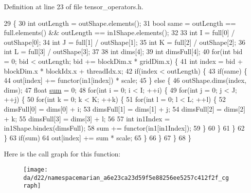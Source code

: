 Definition at line 23 of file tensor\+\_\+operators.\+h.


\begin{DoxyCode}
29                                           \{
30   \textcolor{keywordtype}{int} outLength = outShape.elements();
31   \textcolor{keywordtype}{bool} same = outLength == full.elements() && outLength == in1Shape.elements();
32 
33   \textcolor{keywordtype}{int} I = full[0] / outShape[0];
34   \textcolor{keywordtype}{int} J = full[1] / outShape[1];
35   \textcolor{keywordtype}{int} K = full[2] / outShape[2];
36   \textcolor{keywordtype}{int} L = full[3] / outShape[3];
37 
38   \textcolor{keywordtype}{int} dims[4];
39   \textcolor{keywordtype}{int} dimsFull[4];
40   \textcolor{keywordflow}{for}(\textcolor{keywordtype}{int} bid = 0; bid < outLength; bid += blockDim.x * gridDim.x) \{
41     \textcolor{keywordtype}{int} index = bid + blockDim.x * blockIdx.x + threadIdx.x;
42     \textcolor{keywordflow}{if}(index < outLength) \{
43       \textcolor{keywordflow}{if}(same) \{
44         out[index] += functor(in1[index]) * scale;
45       \} \textcolor{keywordflow}{else} \{
46         outShape.dims(index, dims);
47         \textcolor{keywordtype}{float} \hyperlink{namespacemarian_a460460a6de63beebc5d968b44d49d11b}{sum} = 0;
48         \textcolor{keywordflow}{for}(\textcolor{keywordtype}{int} i = 0; i < I; ++i) \{
49           \textcolor{keywordflow}{for}(\textcolor{keywordtype}{int} j = 0; j < J; ++j) \{
50             \textcolor{keywordflow}{for}(\textcolor{keywordtype}{int} k = 0; k < K; ++k) \{
51               \textcolor{keywordflow}{for}(\textcolor{keywordtype}{int} l = 0; l < L; ++l) \{
52                 dimsFull[0] = dims[0] + i;
53                 dimsFull[1] = dims[1] + j;
54                 dimsFull[2] = dims[2] + k;
55                 dimsFull[3] = dims[3] + l;
56 
57                 \textcolor{keywordtype}{int} in1Index = in1Shape.bindex(dimsFull);
58                 sum += functor(in1[in1Index]);
59               \}
60             \}
61           \}
62         \}
63         \textcolor{keywordflow}{if}(sum)
64           out[index] += sum * scale;
65       \}
66     \}
67   \}
68 \}
\end{DoxyCode}


Here is the call graph for this function\+:
\nopagebreak
\begin{figure}[H]
\begin{center}
\leavevmode
\texttt{[image: da/d22/namespacemarian\_a6e23ca23d59f5e88256ee5257c412f2f\_cgraph]}
\end{center}
\end{figure}


